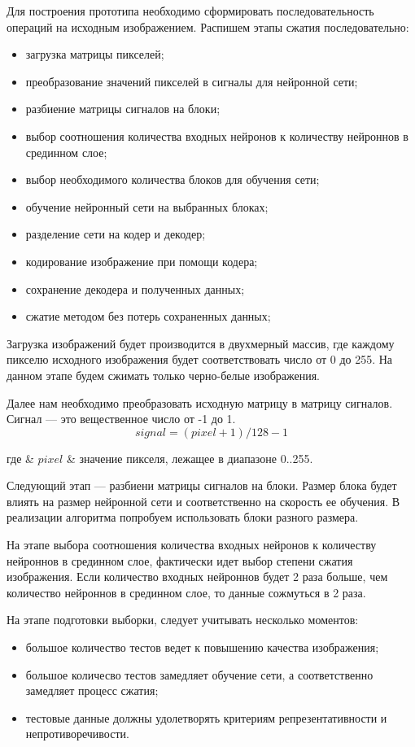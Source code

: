 Для построения прототипа необходимо сформировать последовательность операций на исходным изображением.
Распишем этапы сжатия последовательно:
\begin{itemize}
  \item загрузка матрицы пикселей;
  \item преобразование значений пикселей в сигналы для нейронной сети;
  \item разбиение матрицы сигналов на блоки;
  \item выбор соотношения количества входных нейронов к количеству нейроннов в срединном слое;
  \item выбор необходимого количества блоков для обучения сети;
  \item обучение нейронный сети на выбранных блоках;
  \item разделение сети на кодер и декодер;
  \item кодирование изображение при помощи кодера;
  \item сохранение декодера и полученных данных;
  \item сжатие методом без потерь сохраненных данных;
\end{itemize}

Загрузка изображений будет производится в двухмерный массив, где каждому пикселю исходного изображения будет соответствовать
число от 0 до 255. На данном этапе будем сжимать только черно-белые изображения.

Далее нам необходимо преобразовать исходную матрицу в матрицу сигналов. Сигнал --- это вещественное число от -1 до 1.
\begin{equation}
  \label{eq:research:image_to_signals}
  signal = (pixel + 1)/128-1
\end{equation}
\begin{explanation}
где & $ pixel $ & значение пикселя, лежащее в диапазоне 0..255.
\end{explanation}

Следующий этап --- разбиени матрицы сигналов на блоки.
Размер блока будет влиять на размер нейронной сети и соответственно на скорость ее обучения.
В реализации алгоритма попробуем использовать блоки разного размера.

На этапе выбора соотношения количества входных нейронов к количеству нейроннов в срединном слое,
фактически идет выбор степени сжатия изображения. Если количество входных нейроннов будет 2 раза больше,
чем количество нейроннов в срединном слое, то данные сожмуться в 2 раза.

На этапе подготовки выборки, следует учитывать несколько моментов:
\begin{itemize}
  \item большое количество тестов ведет к повышению качества изображения;
  \item большое количесво тестов замедляет обучение сети, а соответственно замедляет процесс сжатия;
  \item тестовые данные должны удолетворять критериям репрезентативности и непротиворечивости.
\end{itemize}

